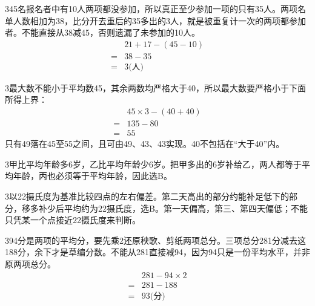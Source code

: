 \documentclass[multi=snippet,border={5bp 20bp 5bp 5bp}]{standalone}
\newenvironment{snippet}[3]{\begin{minipage}{#1bp}\color{answerred}\fontsize{#2}{#3}\selectfont\raggedright}{\end{minipage}}
\begin{document}
\begin{snippet}{505}{11.5}{14}\begin{multicols}{3}\raggedcolumns 45名报名者中有10人两项都没参加，所以真正至少参加一项的只有35人。两项名单人数相加为38，比分开去重后的35多出的3人，就是被重复计一次的两项都参加者。不能直接从38减45，否则遗漏了未参加的10人。\[\begin{aligned}&21+17-(45-10)\\={}&38-35\\={}&3\text{(人)}\end{aligned}\]\end{multicols}\end{snippet}
\begin{snippet}{505}{11.5}{14}\begin{multicols}{3}\raggedcolumns 最大数不能小于平均数45，其余两数均严格大于40，所以最大数要严格小于下面所得上界：\[\begin{aligned}&45\times3-(40+40)\\={}&135-80\\={}&55\end{aligned}\]只有49落在45至55之间，且可由49、43、43实现。40不包括在“大于40”内。\end{multicols}\end{snippet}
\begin{snippet}{505}{11.5}{14}\begin{multicols}{3}\raggedcolumns 甲比平均年龄多6岁，乙比平均年龄少6岁。把甲多出的6岁补给乙，两人都等于平均年龄，丙也必须等于平均年龄，因此选B。\end{multicols}\end{snippet}
\begin{snippet}{505}{11.5}{14}\begin{multicols}{3}\raggedcolumns 以22摄氏度为基准比较四点的左右偏差。第二天高出的部分约能补足低下的部分，移多补少后平均约为22摄氏度，选B。第一天偏高，第三、第四天偏低；不能只凭某一个点接近22摄氏度来判断。\end{multicols}\end{snippet}
\begin{snippet}{505}{11.5}{14}\begin{multicols}{3}\raggedcolumns 94分是两项的平均分，要先乘2还原秧歌、剪纸两项总分。三项总分281分减去这188分，余下才是草编分数。不能从281直接减94，因为94只是一份平均水平，并非原两项总分。\[\begin{aligned}&281-94\times2\\={}&281-188\\={}&93\text{(分)}\end{aligned}\]\end{multicols}\end{snippet}
\end{document}
